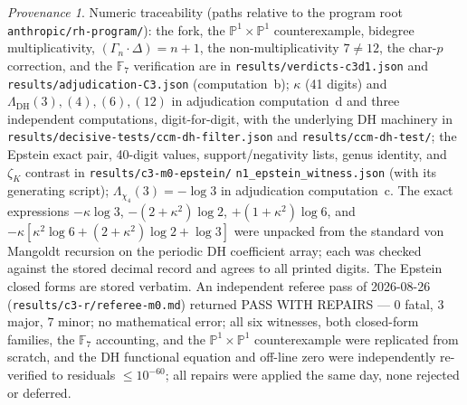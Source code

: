 \documentclass[11pt]{article}
\theoremstyle{plain}
\theoremstyle{definition}
\theoremstyle{remark}
\newtheorem*{provenance}{Provenance}
\begin{document}
\begin{provenance}
Numeric traceability (paths relative to the program root
\texttt{anthropic/rh-program/}): the fork, the
$\mathbb{P}^1 \times \mathbb{P}^1$ counterexample, bidegree multiplicativity,
$(\Gamma_n \cdot \Delta) = n+1$, the non-multiplicativity $7 \ne 12$, the
char-$p$ correction, and the $\mathbb{F}_7$ verification are in
\texttt{results/verdicts-c3d1.json} and \texttt{results/adjudication-C3.json}
(computation~b); $\kappa$ (41 digits) and
$\Lambda_{\mathrm{DH}}(3), (4), (6), (12)$ in adjudication computation~d and
three independent computations, digit-for-digit, with the underlying DH
machinery in \texttt{results/decisive-tests/ccm-dh-filter.json} and
\texttt{results/ccm-dh-test/}; the Epstein exact pair, 40-digit values,
support/negativity lists, genus identity, and $\zeta_K$ contrast in
\texttt{results/c3-m0-epstein/}\allowbreak
\texttt{n1\_epstein\_witness.json} (with its generating
script); $\Lambda_{\chi_4}(3) = -\log 3$ in adjudication computation~c. The
exact expressions $-\kappa \log 3$, $-(2+\kappa^2)\log 2$,
$+(1+\kappa^2)\log 6$, and
$-\kappa[\kappa^2 \log 6 + (2+\kappa^2)\log 2 + \log 3]$ were unpacked from
the standard von Mangoldt recursion on the periodic DH coefficient array; each
was checked against the stored decimal record and agrees to all printed
digits. The Epstein closed forms are stored verbatim. An independent referee
pass of 2026-08-26 (\texttt{results/c3-r/referee-m0.md}) returned PASS WITH
REPAIRS --- $0$ fatal, $3$ major, $7$ minor; no mathematical error; all six
witnesses, both closed-form families, the $\mathbb{F}_7$ accounting, and the
$\mathbb{P}^1 \times \mathbb{P}^1$ counterexample were replicated from
scratch, and the DH functional equation and off-line zero were independently
re-verified to residuals $\le 10^{-60}$; all repairs were applied the same
day, none rejected or deferred.
\end{provenance}
\end{document}

